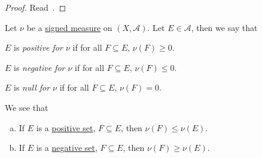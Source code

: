\begin{proof}
	Read~\cite{folland1999real}.
\end{proof}
\begin{definition*}
	Let \(\nu\) be a \hyperref[def:signed-measure]{signed measure} on \((X, \mathcal{A})\). Let \(E \in \mathcal{A}\), then we say that
	\begin{definition}\label{def:positive-set-for-a-signed-measure}
		\(E\) is \emph{positive for \(\nu\)} if for all \(F \subseteq E\), \(\nu(F) \geq 0\).
	\end{definition}
	\begin{definition}\label{def:negative-set-for-a-signed-measure}
		\(E\) is \emph{negative for \(\nu\)} if for all \(F \subseteq E\), \(\nu(F) \leq 0\).
	\end{definition}
	\begin{definition}\label{def:null-set-for-a-signed-measure}
		\(E\) is \emph{null for \(\nu\)} if for all \(F \subseteq E\), \(\nu(F) = 0\).
	\end{definition}
\end{definition*}

\begin{note}
	We see that
	\begin{enumerate}[(a)]
		\item If \(E\) is a \hyperref[def:positive-set-for-a-signed-measure]{positive set}, \(F \subseteq E\), then \(\nu(F) \leq \nu(E)\).
		\item If \(E\) is a \hyperref[def:negative-set-for-a-signed-measure]{negative set}, \(F \subseteq E\), then \(\nu(F) \geq \nu(E)\).
	\end{enumerate}
\end{note}

